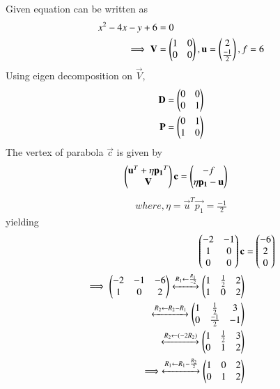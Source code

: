 
Given equation can be written as
\begin{align}
      \label{quadform/51/eq1}
 x^2-4x-y+6 &=0
 \\
 \implies 
\mathbf{V}&=\begin{pmatrix}1 & 0 \\ 0 & 0\end{pmatrix},\mathbf{u}=\begin{pmatrix}2 \\ \frac{-1}{2}\end{pmatrix},f=6  \label{quadform/51/eq2}
\end{align}
Using eigen decomposition on $\vec{V}$,
\begin{align}
\mathbf{D}&= \begin{pmatrix}0 & 0\\0 & 1\end{pmatrix}   \label{quadform/51/eq3}
\\
\mathbf{P}& =\begin{pmatrix}0 & 1\\1 & 0\end{pmatrix}  \label{quadform/51/eq4}
\end{align}
The vertex of parabola $\vec{c}$ is given by
\begin{align}
\begin{pmatrix}\mathbf{u}^T + \eta\mathbf{p_1}^T \\ \mathbf{V}\end{pmatrix}\mathbf{c} &= \begin{pmatrix}-f \\ \eta\mathbf{p_1}-\mathbf{u}\end{pmatrix} \label{quadform/51/eq5}
\end{align}
\begin{align}
where,\eta=\vec{u}^T\vec{p_1}=\frac{-1}{2}  \label{quadform/51/eq6}
\end{align}
yielding
\begin{align}
\begin{pmatrix}-2 & -1 \\ 1 & 0 \\ 0 & 0\end{pmatrix}\mathbf{c} &= \begin{pmatrix}-6 \\ 2 \\ 0\end{pmatrix} \label{quadform/51/eq7}
\\
\implies \begin{pmatrix}-2 & -1 & -6\\1 & 0 & 2\end{pmatrix} 
\xleftrightarrow{R_1\leftarrow \frac{R_1}{-2}}\begin{pmatrix}1 & \frac{1}{2} & 2\\1 & 0 & 2\end{pmatrix} 
\\
\xleftrightarrow{R_2\leftarrow R_2 -R_1}\begin{pmatrix}1 & \frac{1}{2} & 3 \\0 & \frac{-1}{2} & -1\end{pmatrix}
\\
\xleftrightarrow{R_2\leftarrow (-2R_2)}\begin{pmatrix}1 & \frac{1}{2} & 3 \\0 & 1 & 2\end{pmatrix}
\\
\implies \xleftrightarrow{R_1\leftarrow R_1 - \frac{R_2}{2}}\begin{pmatrix}1 & 0 & 2\\0 & 1 & 2\end{pmatrix}   \label{quadform/51/eq8}
\end{align}
